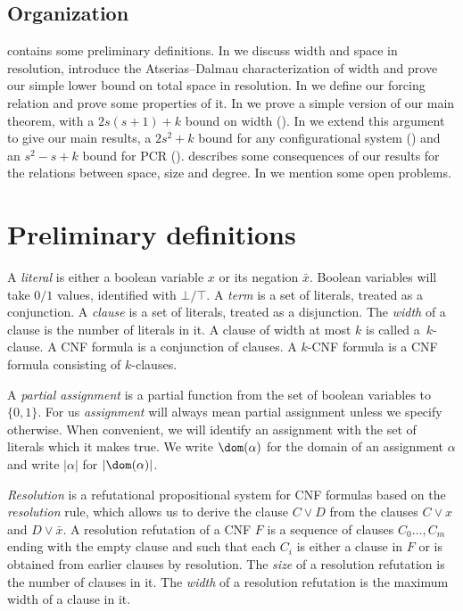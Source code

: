 \documentclass{toc}
\begin{document}
\subsection{Organization}

 contains some preliminary definitions.
In  we discuss width and space in resolution,
introduce the Atserias--Dalmau characterization of width
and prove our simple lower bound on total space in resolution.
In  we define our forcing relation
and prove some properties of it.
In  we prove a simple version
of our main theorem, with a $2s(s+1)+k$ bound on width ().
In  we extend this argument to 
give our main results, a $2s^2+k$ bound for any configurational system
()
and an $s^2-s+k$ bound for PCR ().
 describes some consequences of our
results for the relations between space, size and degree.
In  we mention some open problems.


%
\section{Preliminary definitions}\label{sec:definitions}
%

A \emph{literal} is either a boolean variable $x$ or its negation $\bar x$.
Boolean variables will take $0/1$ values,  
identified with $\bot/ \top$. 
A \emph{term} is a set of literals, treated as a conjunction.
A \emph{clause} is a set of literals, treated as a disjunction. 
The \emph{width} of a clause is the number of literals in it.  A clause of width 
at most $k$ is called a~$k$-clause. A CNF formula  is a conjunction of clauses. A $k$-CNF formula is a CNF formula consisting of $k$-clauses.


A \emph{partial assignment} is a partial function from the set of boolean
variables to $\{0,1\}$. 
For us \emph{assignment} will always mean partial assignment unless we specify otherwise.
When convenient, we will identify an assignment with the set of literals which it makes true.
We write $\dom(\alpha)$ for the domain  of an assignment $\alpha$
and write $|\alpha|$ for $|\dom(\alpha)|$.



\emph{Resolution}
 is a refutational propositional system for CNF formulas based on the 
 \emph{resolution} rule, 
 which allows us to derive the clause $C \vee D$ from the clauses
 $C \vee x$ and $D \vee \bar x$.
A resolution refutation of a CNF $F$ is a sequence of clauses $C_0 \ldots, C_m$ ending with the empty clause 
and such that each $C_i$ is either a clause in $F$ or is obtained from earlier clauses  by 
resolution. 
The \emph{size} of a resolution refutation is the number of clauses in it. The \emph{width} of a resolution refutation is the maximum width
of a clause in it.
 
\end{document}
